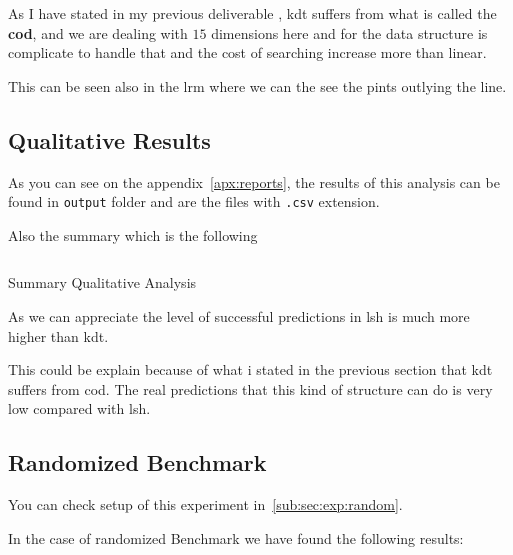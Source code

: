 \documentclass[12pt, a4paper]{article}
\begin{document}
\begin{itemize}
As I have stated in my previous deliverable \cite{hmw2}, \acrshort{kdt} suffers from what is called the \textbf{\acrfull{cod}}, and we are dealing with $15$ dimensions here and for the data structure is complicate to handle that and the cost of searching increase more than linear.

This can be seen also in the \acrshort{lrm} where we can the see the pints outlying the line.
\end{itemize}

\subsection{Qualitative Results}\label{sub:sec:qual:results}
As you can see on the appendix~\ref{apx:reports}, the results of this analysis can be found in \texttt{output} folder and are the files with \texttt{.csv} extension.

Also the summary which is the following

\begin{listing}[H]
\inputminted{text}{../output/data_summary_1587016424.out}
\caption{Summary Qualitative Analysis}
\label{output:summary}
\end{listing}

As we can appreciate the level of successful predictions in \acrshort{lsh} is much more higher than \acrshort{kdt}.

This could be explain because of what i stated in the previous section that \acrshort{kdt} suffers from \acrshort{cod}. The real predictions that this kind of structure can do is very low compared with \acrshort{lsh}.

\subsection{Randomized Benchmark}\label{sub:sec:results:random}
You can check setup of this experiment in~\ref{sub:sec:exp:random}.

In the case of randomized Benchmark we have found the following results:
\end{document}
